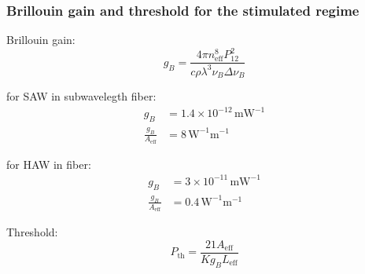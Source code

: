 \documentclass{beamer}
\begin{document}
\begin{frame}
\frametitle{Brillouin gain and threshold for the stimulated regime}

Brillouin gain:
\begin{equation*}
g_B = \frac{4\pi n_{\mathrm{eff}}^8P_{12}^2}{c\rho\lambda^3\nu_B\Delta\nu_B}
\end{equation*}

for SAW in subwavelegth fiber:
\begin{equation*}
\begin{aligned}
g_B &= 1.4\times 10^{-12}\,\mathrm{mW}^{-1}\\
\frac{g_B}{A_{\mathrm{eff}}} &= 8\, \mathrm{W}^{-1}\mathrm{m}^{-1}
\end{aligned}
\end{equation*}

for HAW in  fiber:
\begin{equation*}
\begin{aligned}
g_B &= 3\times 10^{-11}\,\mathrm{mW}^{-1}\\
\frac{g_B}{A_{\mathrm{eff}}} &= 0.4\, \mathrm{W}^{-1}\mathrm{m}^{-1}
\end{aligned}
\end{equation*}


Threshold:
\begin{equation*}
P_{\mathrm{th}}=\frac{21A_{\mathrm{eff}}}{Kg_BL_{\mathrm{eff}}}
\end{equation*}
\end{frame}




\end{document}

